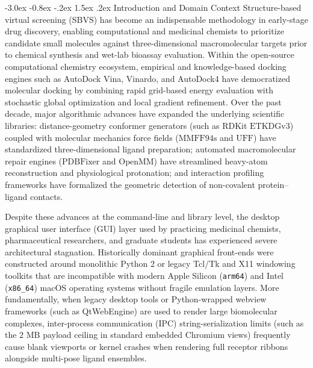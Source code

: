 \documentclass[11pt,a4paper]{article}
\makeatletter
\renewcommand{\section}{\@startsection{section}{1}{\z@}%
  {-3.0ex \@plus -0.8ex \@minus -.2ex}%
  {1.5ex \@plus.2ex}%
  {\normalfont\Large\bfseries\color{primary}}}
\makeatother
\begin{document}
\section{Introduction and Domain Context}
\noindent Structure-based virtual screening (SBVS) has become an indispensable methodology in early-stage drug discovery, enabling computational and medicinal chemists to prioritize candidate small molecules against three-dimensional macromolecular targets prior to chemical synthesis and wet-lab bioassay evaluation. Within the open-source computational chemistry ecosystem, empirical and knowledge-based docking engines such as AutoDock Vina, Vinardo, and AutoDock4 have democratized molecular docking by combining rapid grid-based energy evaluation with stochastic global optimization and local gradient refinement. Over the past decade, major algorithmic advances have expanded the underlying scientific libraries: distance-geometry conformer generators (such as RDKit $\text{ETKDGv3}$) coupled with molecular mechanics force fields ($\text{MMFF94s}$ and $\text{UFF}$) have standardized three-dimensional ligand preparation; automated macromolecular repair engines ($\text{PDBFixer}$ and $\text{OpenMM}$) have streamlined heavy-atom reconstruction and physiological protonation; and interaction profiling frameworks have formalized the geometric detection of non-covalent protein--ligand contacts.

Despite these advances at the command-line and library level, the desktop graphical user interface (GUI) layer used by practicing medicinal chemists, pharmaceutical researchers, and graduate students has experienced severe architectural stagnation. Historically dominant graphical front-ends were constructed around monolithic Python 2 or legacy Tcl/Tk and X11 windowing toolkits that are incompatible with modern Apple Silicon (\texttt{arm64}) and Intel (\texttt{x86\_64}) macOS operating systems without fragile emulation layers. More fundamentally, when legacy desktop tools or Python-wrapped webview frameworks (such as QtWebEngine) are used to render large biomolecular complexes, inter-process communication (IPC) string-serialization limits (such as the $2\text{ MB}$ payload ceiling in standard embedded Chromium views) frequently cause blank viewports or kernel crashes when rendering full receptor ribbons alongside multi-pose ligand ensembles.
\end{document}
